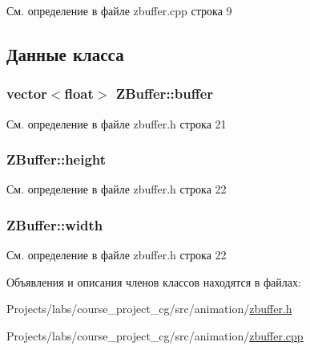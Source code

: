 См. определение в файле zbuffer.\+cpp строка 9



\subsection{Данные класса}
\subsubsection[{\texorpdfstring{buffer}{buffer}}]{\setlength{\rightskip}{0pt plus 5cm}vector$<$float$>$ Z\+Buffer\+::buffer\hspace{0.3cm}{\ttfamily [private]}}\hypertarget{class_z_buffer_afecaf9e4659207dbf258de9b537663e9}{}\label{class_z_buffer_afecaf9e4659207dbf258de9b537663e9}


См. определение в файле zbuffer.\+h строка 21

\subsubsection[{\texorpdfstring{height}{height}}]{ Z\+Buffer\+::height\hspace{0.3cm}{\ttfamily [private]}}\hypertarget{class_z_buffer_a2e0ebf69ff20c3a3c8c6926e812a6275}{}\label{class_z_buffer_a2e0ebf69ff20c3a3c8c6926e812a6275}


См. определение в файле zbuffer.\+h строка 22

\subsubsection[{\texorpdfstring{width}{width}}]{ Z\+Buffer\+::width\hspace{0.3cm}{\ttfamily [private]}}\hypertarget{class_z_buffer_a82c7634da3462d8efaeeba321ec36b24}{}\label{class_z_buffer_a82c7634da3462d8efaeeba321ec36b24}


См. определение в файле zbuffer.\+h строка 22



Объявления и описания членов классов находятся в файлах\+:\begin{DoxyCompactItemize}
\item 
Projects/labs/course\+\_\+project\+\_\+cg/src/animation/\hyperlink{zbuffer_8h}{zbuffer.\+h}\item 
Projects/labs/course\+\_\+project\+\_\+cg/src/animation/\hyperlink{zbuffer_8cpp}{zbuffer.\+cpp}\end{DoxyCompactItemize}
